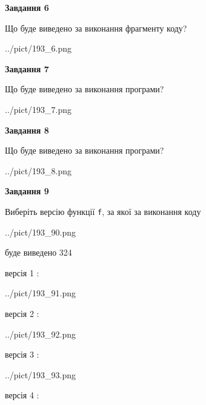 \documentclass[12pt, ukrainian]{article}
\def\code#1{\Verb!#1!}
\begin{document}
{\begin {large}
{\begin {center}\textbf{Завдання 6}\end {center}}

Що буде виведено за виконання фрагменту коду?\par
\begin{center}
	{../pict/193_6.png}
\end{center}
\newpage

{\begin {center}\textbf{Завдання 7}\end {center}}

Що буде виведено за виконання програми?\par
\begin{center}
	{../pict/193_7.png}
\end{center}
\newpage

{\begin {center}\textbf{Завдання 8}\end {center}}

Що буде виведено за виконання програми?\par
\begin{center}
	{../pict/193_8.png}
\end{center}
\newpage

{\begin {center}\textbf{Завдання 9}\end {center}}

Виберіть версію функції \code{f}, за якої за виконання коду
\begin{center}
	{../pict/193_90.png}
\end{center}
буде виведено 324

\vspace{5mm}
версія 1 :

\begin{center}
	{../pict/193_91.png}
\end{center}
версія 2 :

\begin{center}
	{../pict/193_92.png}
\end{center}
версія 3 :

\begin{center}
	{../pict/193_93.png}
\end{center}
версія 4 :


\end{large}}
\end{document}
